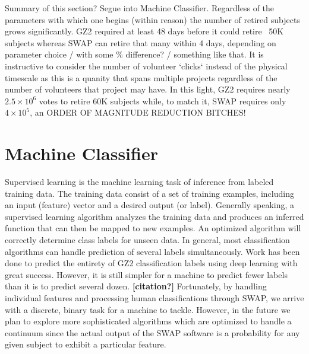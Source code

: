 \documentclass[twocolumn]{aastex6}
\begin{document}
Summary of this section? Segue into Machine Classifier. Regardless of the parameters
with which one begins (within reason) the number of retired subjects grows significantly. 
GZ2 required at least 48 days before it could retire ~50K subjects whereas SWAP
can retire that many within 4 days, depending on parameter choice / with some 
\% difference? / something like that. It is instructive to consider the number of
volunteer `clicks` instead of the physical timescale as this is a quanity that 
spans multiple projects regardless of the number of volunteers that project may
have. In this light, GZ2 requires nearly $2.5\times10^6$ votes to retire 60K
subjects while, to match it, SWAP requires only $4\times10^5$, an ORDER OF MAGNITUDE REDUCTION BITCHES! 



\section{Machine Classifier} \label{sec:machine}

Supervised learning is the machine learning task of inference from labeled 
training data. The training data consist of a set of training examples, including
an input (feature) vector and a desired output (or label).  Generally speaking,
a supervised learning algorithm analyzes the training data and produces an inferred 
function that can then be mapped to new examples. An optimized algorithm will 
correctly determine class labels for unseen data. In general, most classification 
algorithms can handle prediction of several labels simultaneously. Work has been
done to predict the entirety of GZ2 classification labels using deep learning 
\citep{Dieleman2015} with great success. However, it is still simpler for a machine
to predict fewer labels than it is to predict several dozen. \textbf{[citation?]} 
Fortunately, by handling individual features and processing human classifications
through SWAP, we arrive with a discrete, binary task for a machine to tackle.
However, in the future we plan to explore more sophisticated algorithms which 
are optimized to handle a continuum since the actual output of the SWAP software
is a probability for any given subject to exhibit a particular feature. 
\end{document}
